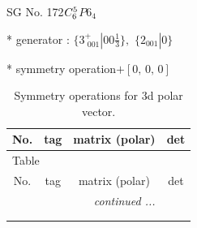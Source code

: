 \documentclass[fleqn,8pt]{jsarticle}
\begin{document}
\setcounter{MaxMatrixCols}{32}

\renewcommand{\tablename}{Table~}
\renewcommand{\figurename}{Figure~}
\begin{center}
\LARGE
SG No. 172\quad$C_{\rm 6}^{5}$\quad$P6_4$\quad[ hexagonal ]
\end{center}

* generator : $\{3^{+}_{\,\,001}|0 0 \frac{1}{3}\},\,\,\{2{}_{001}|0\}$

* symmetry operation\quad$+\left[ 0,\, 0,\, 0 \right]$
\renewcommand{\arraystretch}{1.3}
\begin{longtable}{cccc}
\caption{Symmetry operations for 3d polar vector.}
 \\
 \hline \hline
No. & tag & matrix (polar) & det \\ \hline \endfirsthead

\multicolumn{3}{l}{\tablename\ \thetable{}} \\
 \hline \hline
No. & tag & matrix (polar) & det \\ \hline \endhead

 \hline \hline
\multicolumn{3}{r}{\footnotesize\it continued ...} \\ \endfoot

 \hline \hline
\multicolumn{3}{r}{} \\ \endlastfoot


\end{longtable}
\end{document}
